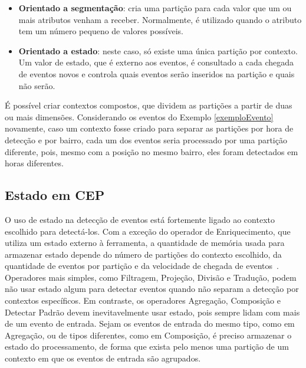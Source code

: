\begin{itemize}
\begin{itemize}
\end{itemize}
\item \textbf{Orientado a segmentação}: %
cria uma partição para cada valor que um ou mais atributos venham a receber. Normalmente, é utilizado quando o atributo tem um número pequeno de valores possíveis.
\item \textbf{Orientado a estado}: neste caso, só existe uma única partição por contexto. Um valor de estado, que é externo aos eventos, é consultado a cada chegada de eventos novos e controla quais eventos serão inseridos na partição e quais não serão. 
\end{itemize}
É possível criar contextos compostos, que dividem as partições a partir de duas ou mais dimensões. Considerando os eventos do Exemplo \ref{exemploEvento} novamente, caso um contexto fosse criado para separar as partições por hora de detecção e por bairro, cada um dos eventos seria processado por uma partição diferente, pois, mesmo com a posição no mesmo bairro, eles foram detectados em horas diferentes. 

%

\subsection{Estado em CEP}
\label{sec:CEPstate}


O uso de estado na detecção de eventos está fortemente ligado ao contexto escolhido para detectá-los. Com a exceção do operador de Enriquecimento, que utiliza um estado externo à ferramenta, a quantidade de memória usada para armazenar estado depende do número de partições do contexto escolhido, da quantidade de eventos por partição e da velocidade de chegada de eventos~\citep{Etzion:2010:EPA:1894960}. Operadores mais simples, como Filtragem, Projeção, Divisão e Tradução, podem não usar estado algum para detectar eventos quando não separam a detecção por contextos específicos. Em contraste, os operadores Agregação, Composição e Detectar Padrão devem inevitavelmente usar estado, pois sempre lidam com mais de um evento de entrada. Sejam os eventos de entrada do mesmo tipo, como em Agregação, ou de tipos diferentes, como em Composição, é preciso armazenar o estado do processamento, de forma que exista pelo menos uma partição de um contexto em que os eventos de entrada são agrupados. 

